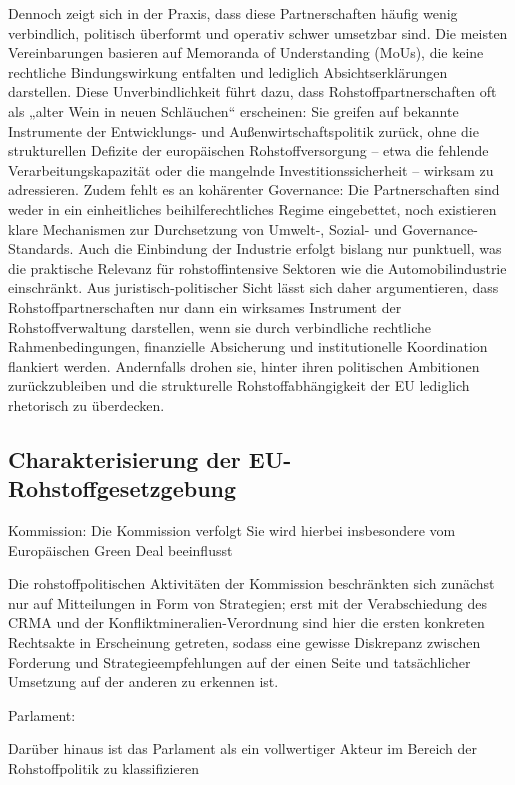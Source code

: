 \documentclass[12pt,a4paper,oneside]{book} %
\begin{document}
Dennoch zeigt sich in der Praxis, dass diese Partnerschaften häufig wenig verbindlich, politisch überformt und operativ schwer umsetzbar sind. Die meisten Vereinbarungen basieren auf Memoranda of Understanding (MoUs), die keine rechtliche Bindungswirkung entfalten und lediglich Absichtserklärungen darstellen. Diese Unverbindlichkeit führt dazu, dass Rohstoffpartnerschaften oft als „alter Wein in neuen Schläuchen“ erscheinen: Sie greifen auf bekannte Instrumente der Entwicklungs- und Außenwirtschaftspolitik zurück, ohne die strukturellen Defizite der europäischen Rohstoffversorgung – etwa die fehlende Verarbeitungskapazität oder die mangelnde Investitionssicherheit – wirksam zu adressieren. Zudem fehlt es an kohärenter Governance: Die Partnerschaften sind weder in ein einheitliches beihilferechtliches Regime eingebettet, noch existieren klare Mechanismen zur Durchsetzung von Umwelt-, Sozial- und Governance-Standards. Auch die Einbindung der Industrie erfolgt bislang nur punktuell, was die praktische Relevanz für rohstoffintensive Sektoren wie die Automobilindustrie einschränkt. Aus juristisch-politischer Sicht lässt sich daher argumentieren, dass Rohstoffpartnerschaften nur dann ein wirksames Instrument der Rohstoffverwaltung darstellen, wenn sie durch verbindliche rechtliche Rahmenbedingungen, finanzielle Absicherung und institutionelle Koordination flankiert werden. Andernfalls drohen sie, hinter ihren politischen Ambitionen zurückzubleiben und die strukturelle Rohstoffabhängigkeit der EU lediglich rhetorisch zu überdecken.


\subsection{Charakterisierung der EU-Rohstoffgesetzgebung}

Kommission: Die Kommission verfolgt 
Sie wird hierbei insbesondere vom Europäischen Green Deal beeinflusst

Die rohstoffpolitischen Aktivitäten der Kommission beschränkten sich zunächst nur auf Mitteilungen in Form von Strategien; erst mit der Verabschiedung des CRMA und der Konfliktmineralien-Verordnung sind hier die ersten konkreten Rechtsakte in Erscheinung getreten, sodass eine gewisse Diskrepanz zwischen Forderung und Strategieempfehlungen auf der einen Seite und tatsächlicher Umsetzung auf der anderen zu erkennen ist.

Parlament: 

Darüber hinaus ist das Parlament als ein vollwertiger Akteur im Bereich der Rohstoffpolitik zu klassifizieren
\end{document}
